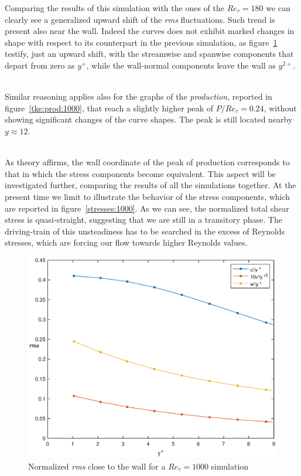 Comparing the results of this simulation with the ones of the $Re_{\tau}=180$ we can clearly see a generalized upward shift of the \emph{rms} fluctuations. Such trend is present also near the wall. Indeed the curves does not exhibit marked changes in shape with respect to its counterpart in the previous simulation, as figure~\ref{wall:rms:1000} testify, just an upward shift, with the streamwise and spanwise components that depart from zero as $y^{+}$, while the wall-normal components leave the wall as $y^{2+}$. \\~\par

Similar reasoning applies also for the graphs of the \emph{production}, reported in figure~\ref{tke:prod:1000}, that reach a slightly higher peak of $P/Re_{\tau}=0.24$, without showing significant changes of the curve shapes. The peak is still located nearby $y\approx 12$.\\~\par

As theory affirms, the wall coordinate of the peak of production corresponds to that in which the stress components become equivalent. This aspect will be investigated further, comparing the results of all the simulations together.
At the present time we limit to illustrate the behavior of the stress components, which are reported in figure~\ref{stresses:1000}. As we can see, the normalized total shear stress is quasi-straight, suggesting that we are still in a transitory phase. The driving-train of this unsteadiness has to be searched in the excess of Reynolds stresses, which are forcing our flow towards higher Reynolds values. \par
\begin{figure}
\begin{center}
\includegraphics[scale=0.55]{grafici/wall_rms_1000.eps}
\caption{Normalized \emph{rms} close to the wall for a $Re_{\tau}=1000$ simulation}
\label{wall:rms:1000}
\end{center} 
\end{figure}

